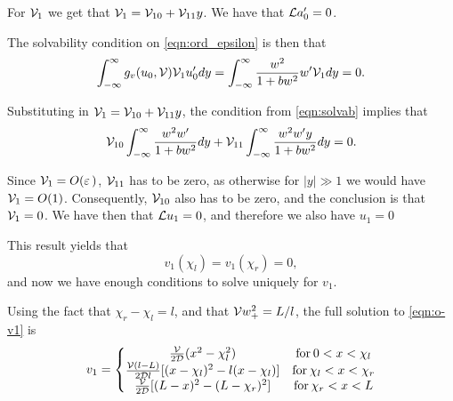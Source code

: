 For $\mathcal{V}_1$ we get that $\mathcal{V}_1 = \mathcal{V}_{10} + \mathcal{V}_{11}y$. We have that $\mathcal{L} a_0' = 0$.

The solvability condition on \eqref{eqn:ord_epsilon} is then that 
% 
\begin{equation}
\label{eqn:solvab}
\begin{split}
\begin{aligned}
\int_{-\infty}^{\infty}g_v(u_0,\mathcal{V})\mathcal{V}_1u_0'dy = \int_{-\infty}^{\infty}\frac{w^2}{1+bw^2}w'\mathcal{V}_1dy = 0.
\end{aligned}
\end{split}
\end{equation}
% 

Substituting in $\mathcal{V}_1 = \mathcal{V}_{10} + \mathcal{V}_{11}y$, the condition from \eqref{eqn:solvab} implies that
% 
\begin{equation*}
\begin{split}
\begin{aligned}
\mathcal{V}_{10}\int_{-\infty}^{\infty}\frac{w^2w'}{1+bw^2}dy + \mathcal{V}_{11}\int_{-\infty}^{\infty}\frac{w^2w'y}{1+bw^2}dy = 0.
\end{aligned}
\end{split}
\end{equation*}
% 

Since $\mathcal{V}_1 = O(\varepsilon\,)$, $\mathcal{V}_{11}$ has to be zero, as otherwise for $|y|\gg 1$ we would have $\mathcal{V}_1 = O(1)$. Consequently, $\mathcal{V}_{10}$ also has to be zero, and the conclusion is that $\mathcal{V}_1=0$. We have then that $\mathcal{L} u_1 = 0$, and therefore we also have $u_1 = 0$

This result yields that 
% 
\begin{equation*}
  v_1(\chi_l)  = v_1(\chi_r) = 0,
\end{equation*}
% 
and now we have enough conditions to solve uniquely for $v_1$.

Using the fact that $\chi_r-\chi_l = l$, and that $\mathcal{V} w_+^2 = L/l$, the full solution to \eqref{eqn:o-v1} is
% 
\begin{equation*}
	\begin{split}
	v_1
   = \left\{
	\begin{matrix}
		\frac{\mathcal{V}}{2\mathcal{D}}(x^2-\chi_l^2)& \mathrm{for}\hspace{2pt}0< x<\chi_l \\
		\frac{\mathcal{V}(l-L)}{2\mathcal{D} l}[(x-\chi_l)^2 - l(x-\chi_l)]& \mathrm{for}\hspace{2pt}\chi_l< x<\chi_r\\
		\frac{\mathcal{V}}{2\mathcal{D}}[(L-x)^2-(L-\chi_r)^2]& \mathrm{for}\hspace{2pt}\chi_r<x<L
	\end{matrix}\right.
	\end{split}
\end{equation*}
% 

